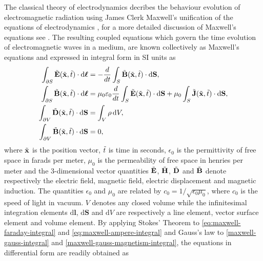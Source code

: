 The classical theory of electrodynamics decribes the behaviour evolution of electromagnetic radiation using James Clerk Maxwell's unification of the equations of electrodynamics \cite{Maxwell:1863ur}, for a more detailed discussion of Maxwell's equations see \cite{Balanis:ui,Jackson:490457}. The resulting coupled equations which govern the time evolution of electromagnetic waves in a medium, are known collectively as Maxwell's equations and expressed in integral form in SI units as
\begin{subequations}
\begin{align}
    \int_{\partial S} \tilde{\mathbf{E}}(\tilde{\mathbf{x}},\tilde{t}) \cdot \mathrm{d}\boldsymbol{\ell}  &= - \frac{d}{dt} \int_{S} \tilde{\mathbf{B}}(\tilde{\mathbf{x}},\tilde{t}) \cdot \mathrm{d}\mathbf{S}, \label{eq:maxwell-faraday-integral} \\
    \int_{\partial S} \tilde{\mathbf{B}}(\tilde{\mathbf{x}},\tilde{t}) \cdot \mathrm{d}\boldsymbol{\ell} &= \mu_0 \varepsilon_0 \frac{d}{dt} \int_{S} \tilde{\mathbf{E}}(\tilde{\mathbf{x}},\tilde{t}) \cdot \mathrm{d}\mathbf{S} +  \mu_0 \int_{S} \tilde{\mathbf{J}}(\tilde{\mathbf{x}},\tilde{t}) \cdot \mathrm{d}\mathbf{S}, \label{eq:maxwell-ampere-integral} \\
    \int_{\partial V} \tilde{\mathbf{D}}(\tilde{\mathbf{x}},\tilde{t})\cdot\mathrm{d}\mathbf{S} &= \int_V \rho \,\mathrm{d}V, \label{maxwell-gauss-integral} \\
    \int_{\partial V} \tilde{\mathbf{B}}(\tilde{\mathbf{x}},\tilde{t})\cdot\mathrm{d}\mathbf{S} &= 0, \label{maxwell-gauss-magnetism-integral}
\end{align}
\end{subequations}
where $\tilde{\mathbf{x}}$ is the position vector, $\tilde{t}$ is time in seconds, $\epsilon_0$ is the permittivity of free space in farads per meter, $\mu_0$ is the permeability of free space in henries per meter and the 3-dimensional vector quantities $\tilde{\mathbf{E}}$, $\tilde{\mathbf{H}}$, $\tilde{\mathbf{D}}$ and $\tilde{\mathbf{B}}$ denote respectively the electric field, magnetic field, electric displacement and magnetic induction. The quantities $\epsilon_0$ and $\mu_0$ are related by $c_0 = 1/ \sqrt{\epsilon_0 \mu_0}$, where $c_0$ is the speed of light in vacuum.
$V$ denotes any closed volume while the infinitesimal integration elements $\mathrm{d}\mathbf{l}$, $\mathrm{d}\mathbf{S}$ and $\mathrm{d}V$ are respectively a line element, vector surface element and volume element.
By applying Stokes' Theorem to \eqref{eq:maxwell-faraday-integral} and \eqref{eq:maxwell-ampere-integral} and Gauss's law to \eqref{maxwell-gauss-integral} and \eqref{maxwell-gauss-magnetism-integral}, the equations in differential form are readily obtained as
